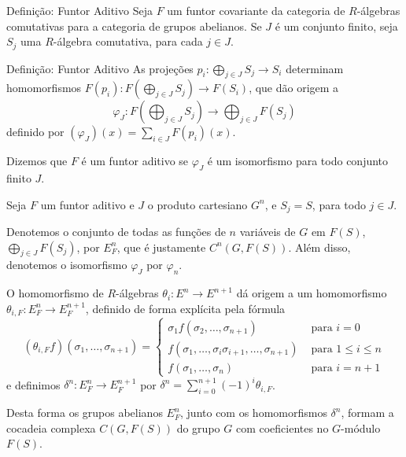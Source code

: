 \documentclass{beamer}
\begin{document}
\begin{frame}{Definição: Funtor Aditivo}
    Seja $F$ um funtor covariante da categoria de $R$-álgebras comutativas para a categoria de grupos abelianos. Se $J$ é um conjunto finito, seja $S_j$ uma $R$-álgebra comutativa, para cada $j\in J$.
\end{frame}

\begin{frame}{Definição: Funtor Aditivo}
    As projeções $p_i: \bigoplus_{j \in J} S_j \rightarrow S_i$
    determinam homomorfismos $F(p_i):F\left(\bigoplus_{j\in J} S_j\right)\rightarrow F\left(S_i\right)$, que dão origem a
    \[\varphi_J: F\left(\bigoplus_{j\in J}S_j\right) \rightarrow \bigoplus_{j\in J} F\left(S_j\right)\] definido por $(\varphi_J)(x) = \sum_{i \in J}F(p_i)(x)$.
    
    \vspace{18pt}
    
    Dizemos que $F$ é um funtor aditivo se $\varphi_J$ é um isomorfismo para todo conjunto finito $J$.
\end{frame}

\begin{frame}
    Seja $F$ um funtor aditivo e $J$ o produto cartesiano $G^n$, e $S_j = S$, para todo $j \in J$.
    
    \vspace{18pt}
    
    Denotemos o conjunto de todas as funções de $n$ variáveis de $G$ em $F(S)$, $\bigoplus_{j\in J}F(S_j)$, por $E_F^n$, que é justamente $C^n(G, F(S))$. Além disso, denotemos o isomorfismo $\varphi_J$ por $\varphi_n$.
\end{frame}

\begin{frame}
    O homomorfismo de $R$-álgebras $\theta_i: E^n \rightarrow E^{n+1}$ dá origem a um homomorfismo $\theta_{i,F}: E^n_F\rightarrow E_F^{n+1}$, definido de forma explícita pela fórmula
    \[  (\theta_{i,F}f)(\sigma_1,\dots,\sigma_{n+1}) = \begin{cases} \sigma_1 f(\sigma_2,\dots,\sigma_{n+1}) &\text{ para }i=0 \\
    f(\sigma_1,\dots,\sigma_i\sigma_{i+1},\dots,\sigma_{n+1} ) &\text{ para } 1\leq i \leq n \\
    f(\sigma_1,\dots,\sigma_n) &\text{ para }i=n+1
    \end{cases}\]
    e definimos $\delta^n: E_F^n \rightarrow E_F^{n+1}$ por $\delta^n = \sum_{i=0}^{n+1} (-1)^i \theta_{i,F}$.
    
    Desta forma os grupos abelianos $E_F^n$, junto com os homomorfismos $\delta^n$, formam a cocadeia complexa $C(G,F(S))$ do grupo $G$ com coeficientes no $G$-módulo $F(S)$.
\end{frame}
\end{document}

